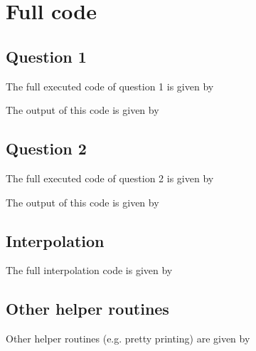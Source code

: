 \section{Full code}
\subsection{Question 1}
The full executed code of question 1 is given by

The output of this code is given by


\subsection{Question 2}
The full executed code of question 2 is given by

The output of this code is given by


\subsection{Interpolation}
\label{sec:interpolation}
The full interpolation code is given by


\subsection{Other helper routines}
Other helper routines (e.g. pretty printing) are given by

